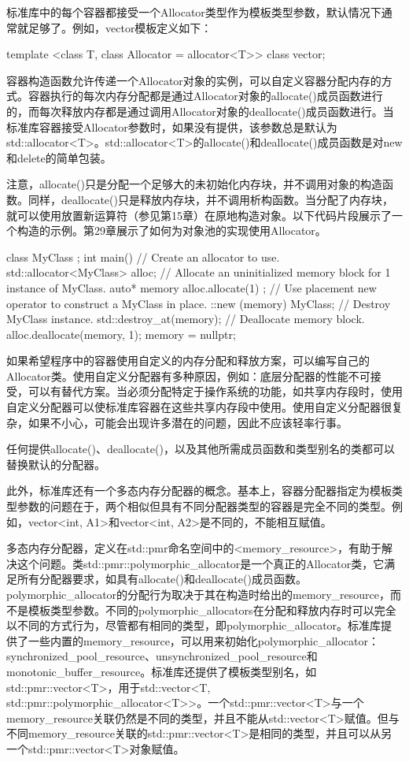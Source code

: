标准库中的每个容器都接受一个Allocator类型作为模板类型参数，默认情况下通常就足够了。例如，vector模板定义如下：

\begin{cpp}
template <class T, class Allocator = allocator<T>> class vector;
\end{cpp}

容器构造函数允许传递一个Allocator对象的实例，可以自定义容器分配内存的方式。容器执行的每次内存分配都是通过Allocator对象的allocate()成员函数进行的，而每次释放内存都是通过调用Allocator对象的deallocate()成员函数进行。当标准库容器接受Allocator参数时，如果没有提供，该参数总是默认为std::allocator<T>。std::allocator<T>的allocate()和deallocate()成员函数是对new和delete的简单包装。

注意，allocate()只是分配一个足够大的未初始化内存块，并不调用对象的构造函数。同样，deallocate()只是释放内存块，并不调用析构函数。当分配了内存块，就可以使用放置新运算符（参见第15章）在原地构造对象。以下代码片段展示了一个构造的示例。第29章展示了如何为对象池的实现使用Allocator。

\begin{cpp}
class MyClass {};
int main()
{
    // Create an allocator to use.
    std::allocator<MyClass> alloc;
    // Allocate an uninitialized memory block for 1 instance of MyClass.
    auto* memory { alloc.allocate(1) };
    // Use placement new operator to construct a MyClass in place.
    ::new (memory) MyClass{};
    // Destroy MyClass instance.
    std::destroy_at(memory);
    // Deallocate memory block.
    alloc.deallocate(memory, 1);
    memory = nullptr;
}
\end{cpp}

如果希望程序中的容器使用自定义的内存分配和释放方案，可以编写自己的Allocator类。使用自定义分配器有多种原因，例如：底层分配器的性能不可接受，可以有替代方案。当必须分配特定于操作系统的功能，如共享内存段时，使用自定义分配器可以使标准库容器在这些共享内存段中使用。使用自定义分配器很复杂，如果不小心，可能会出现许多潜在的问题，因此不应该轻率行事。

任何提供allocate()、deallocate()，以及其他所需成员函数和类型别名的类都可以替换默认的分配器。

此外，标准库还有一个多态内存分配器的概念。基本上，容器分配器指定为模板类型参数的问题在于，两个相似但具有不同分配器类型的容器是完全不同的类型。例如，vector<int, A1>和vector<int, A2>是不同的，不能相互赋值。

多态内存分配器，定义在std::pmr命名空间中的<memory\_resource>，有助于解决这个问题。类std::pmr::polymorphic\_allocator是一个真正的Allocator类，它满足所有分配器要求，如具有allocate()和deallocate()成员函数。polymorphic\_allocator的分配行为取决于其在构造时给出的memory\_resource，而不是模板类型参数。不同的polymorphic\_allocators在分配和释放内存时可以完全以不同的方式行为，尽管都有相同的类型，即polymorphic\_allocator。标准库提供了一些内置的memory\_resource，可以用来初始化polymorphic\_allocator：synchronized\_pool\_resource、unsynchronized\_pool\_resource和monotonic\_buffer\_resource。标准库还提供了模板类型别名，如std::pmr::vector<T>，用于std::vector<T, std::pmr::polymorphic\_allocator<T>>。一个std::pmr::vector<T>与一个memory\_resource关联仍然是不同的类型，并且不能从std::vector<T>赋值。但与不同memory\_resource关联的std::pmr::vector<T>是相同的类型，并且可以从另一个std::pmr::vector<T>对象赋值。

